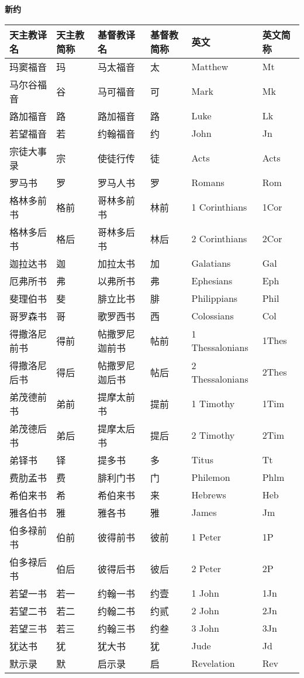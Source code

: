 \newpage

\begin{center}
	\textbf{新约}
\end{center}

\begin{longtable}{|l|l|l|l|l|l|}
	\hline 
	\textbf{天主教译名} & \textbf{天主教简称} & \textbf{基督教译名} & \textbf{基督教简称} & \textbf{英文} & \textbf{英文简称} \\ 
	\hline 
	玛窦福音 & 玛 & 马太福音 & 太 & Matthew & Mt \\
	\hline
	马尔谷福音 & 谷 & 马可福音 & 可 & Mark & Mk \\
	\hline
	路加福音 & 路 & 路加福音 & 路 & Luke & Lk \\
	\hline
	若望福音 & 若 & 约翰福音 & 约 & John & Jn \\
	\hline
	宗徒大事录 & 宗 & 使徒行传 & 徒 & Acts & Acts \\
	\hline
	罗马书 & 罗 & 罗马人书 & 罗 & Romans & Rom \\
	\hline
	格林多前书 & 格前 & 哥林多前书 & 林前 & 1 Corinthians & 1Cor \\
	\hline
	格林多后书 & 格后 & 哥林多后书 & 林后 & 2 Corinthians & 2Cor \\
	\hline
	迦拉达书 & 迦 & 加拉太书 & 加 & Galatians & Gal \\
	\hline
	厄弗所书 & 弗 & 以弗所书 & 弗 & Ephesians & Eph \\
	\hline
	斐理伯书 & 斐 & 腓立比书 & 腓 & Philippians & Phil \\
	\hline
	哥罗森书 & 哥 & 歌罗西书 & 西 & Colossians & Col \\
	\hline
	得撒洛尼前书 & 得前 & 帖撒罗尼迦前书 & 帖前 & 1 Thessalonians & 1Thes \\
	\hline
	得撒洛尼后书 & 得后 & 帖撒罗尼迦后书 & 帖后 & 2 Thessalonians & 2Thes \\
	\hline
	弟茂德前书 & 弟前 & 提摩太前书 & 提前 & 1 Timothy & 1Tim \\
	\hline
	弟茂德后书 & 弟后 & 提摩太后书 & 提后 & 2 Timothy & 2Tim \\
	\hline
	弟铎书 & 铎 & 提多书 & 多 & Titus & Tt \\
	\hline
	费肋孟书 & 费 & 腓利门书 & 门 & Philemon & Phlm \\
	\hline
	希伯来书 & 希 & 希伯来书 & 来 & Hebrews & Heb \\
	\hline
	雅各伯书 & 雅 & 雅各书 & 雅 & James & Jm \\
	\hline
	伯多禄前书 & 伯前 & 彼得前书 & 彼前 & 1 Peter & 1P \\
	\hline
	伯多禄后书 & 伯后 & 彼得后书 & 彼后 & 2 Peter & 2P \\
	\hline
	若望一书 & 若一 & 约翰一书 & 约壹 & 1 John & 1Jn \\
	\hline
	若望二书 & 若二 & 约翰二书 & 约贰 & 2 John & 2Jn \\
	\hline
	若望三书 & 若三 & 约翰三书 & 约叁 & 3 John & 3Jn \\
	\hline
	犹达书 & 犹 & 犹大书 & 犹 & Jude & Jd \\
	\hline
	默示录 & 默 & 启示录 & 启 & Revelation & Rev \\
	\hline
\end{longtable}